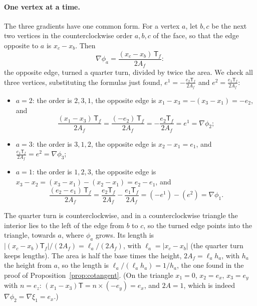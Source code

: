 \paragraph{One vertex at a time.} The three gradients have one common form. For a vertex $a$, let $b, c$ be the next two vertices in the counterclockwise order $a, b, c$ of the face, so that the edge opposite to $a$ is $x_c - x_b$. Then
\begin{equation}
\label{eqn:ga_grad_edge}
\nabla \phi_a = \frac{(x_c - x_b)\, \mathsf T_f}{2 A_f} :
\end{equation}
the opposite edge, turned a quarter turn, divided by twice the area. We check all three vertices, substituting the formulas just found, $e^1 = -\frac{e_2\mathsf T_f}{2A_f}$ and $e^2 = \frac{e_1\mathsf T_f}{2A_f}$:
\begin{itemize}
\item $a = 2$: the order is $2, 3, 1$, the opposite edge is $x_1 - x_3 = -(x_3 - x_1) = -e_2$, and
\begin{equation*}
\frac{(x_1 - x_3)\,\mathsf T_f}{2A_f} = \frac{(-e_2)\,\mathsf T_f}{2A_f} = -\frac{e_2\mathsf T_f}{2A_f} = e^1 = \nabla\phi_2 ;
\end{equation*}
\item $a = 3$: the order is $3, 1, 2$, the opposite edge is $x_2 - x_1 = e_1$, and $\frac{e_1\mathsf T_f}{2A_f} = e^2 = \nabla\phi_3$;
\item $a = 1$: the order is $1, 2, 3$, the opposite edge is $x_3 - x_2 = (x_3 - x_1) - (x_2 - x_1) = e_2 - e_1$, and
\begin{equation*}
\frac{(e_2 - e_1)\,\mathsf T_f}{2A_f} = \frac{e_2\mathsf T_f}{2A_f} - \frac{e_1\mathsf T_f}{2A_f} = (-e^1) - (e^2) = \nabla\phi_1 .
\end{equation*}
\end{itemize}
The quarter turn is counterclockwise, and in a counterclockwise triangle the interior lies to the left of the edge from $b$ to $c$, so the turned edge points into the triangle, towards $a$, where $\phi_a$ grows. Its length is $|(x_c - x_b)\mathsf T_f|/(2A_f) = \ell_a/(2A_f)$, with $\ell_a = |x_c - x_b|$ (the quarter turn keeps lengths). The area is half the base times the height, $2A_f = \ell_a h_a$, with $h_a$ the height from $a$, so the length is $\ell_a/(\ell_a h_a) = 1/h_a$, the one found in the proof of Proposition~\ref{prop:cotangent}. (On the triangle $x_1 = 0$, $x_2 = e_x$, $x_3 = e_y$ with $n = e_z$: $(x_1 - x_3)\mathsf T = n \times (-e_y) = e_x$, and $2A = 1$, which is indeed $\nabla \phi_2 = \nabla\xi_1 = e_x$.)

